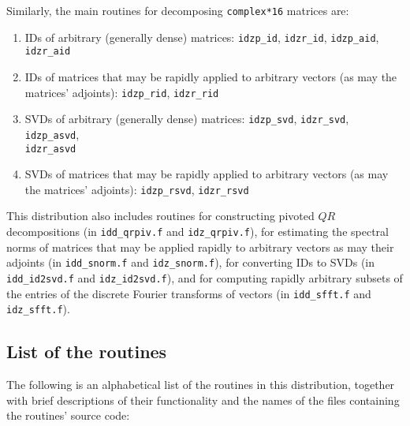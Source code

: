 \documentclass[letterpaper,12pt]{article}
\begin{document}
Similarly, the main routines for decomposing {\tt complex*16} matrices
are:
%
\begin{enumerate}
%
\item IDs of arbitrary (generally dense) matrices:
{\tt idzp\_id}, {\tt idzr\_id}, {\tt idzp\_aid}, {\tt idzr\_aid}
%
\item IDs of matrices that may be rapidly applied to arbitrary vectors
(as may the matrices' adjoints):
{\tt idzp\_rid}, {\tt idzr\_rid}
%
\item SVDs of arbitrary (generally dense) matrices:
{\tt idzp\_svd}, {\tt idzr\_svd}, {\tt idzp\_asvd},\\{\tt idzr\_asvd}
%
\item SVDs of matrices that may be rapidly applied to arbitrary vectors
(as may the matrices' adjoints):
{\tt idzp\_rsvd}, {\tt idzr\_rsvd}
%
\end{enumerate}

This distribution also includes routines for constructing pivoted $QR$
decompositions (in {\tt idd\_qrpiv.f} and {\tt idz\_qrpiv.f}), for
estimating the spectral norms of matrices that may be applied rapidly
to arbitrary vectors as may their adjoints (in {\tt idd\_snorm.f}
and {\tt idz\_snorm.f}), for converting IDs to SVDs (in
{\tt idd\_id2svd.f} and {\tt idz\_id2svd.f}), and for computing rapidly
arbitrary subsets of the entries of the discrete Fourier transforms
of vectors (in {\tt idd\_sfft.f} and {\tt idz\_sfft.f}).


\subsection{List of the routines}

The following is an alphabetical list of the routines
in this distribution, together with brief descriptions
of their functionality and the names of the files containing
the routines' source code:
\end{document}
